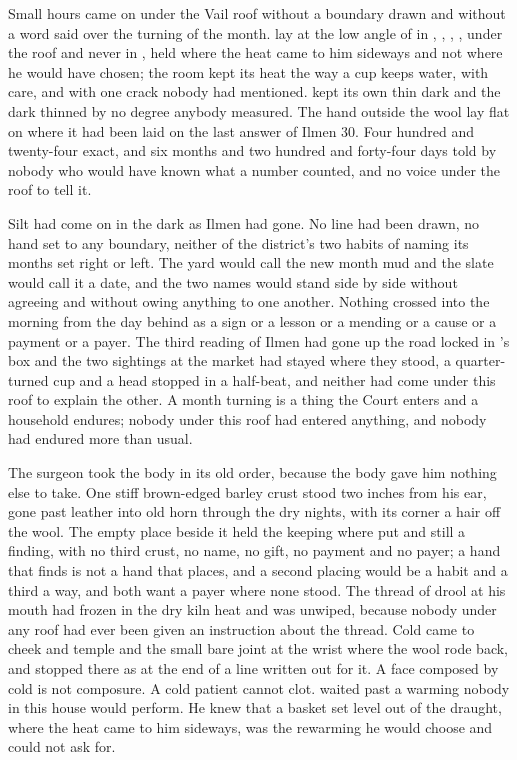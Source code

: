 
Small hours came on under the Vail roof without a boundary drawn and without a word said over the turning of the month.  lay at the low angle of  in , , , , under the roof and never in , held where the heat came to him sideways and not where he would have chosen; the room kept its heat the way a cup keeps water, with care, and with one crack nobody had mentioned.  kept its own thin dark and the dark thinned by no degree anybody measured. The hand outside the wool lay flat on  where it had been laid on the last answer of Ilmen 30. Four hundred and twenty-four exact, and six months and two hundred and forty-four days told by nobody who would have known what a number counted, and no voice under the roof to tell it.

Silt had come on in the dark as Ilmen had gone. No line had been drawn, no hand set to any boundary, neither of the district's two habits of naming its months set right or left. The yard would call the new month mud and the slate would call it a date, and the two names would stand side by side without agreeing and without owing anything to one another. Nothing crossed into the morning from the day behind as a sign or a lesson or a mending or a cause or a payment or a payer. The third reading of Ilmen had gone up the road locked in 's box and the two sightings at the market had stayed where they stood, a quarter-turned cup and a head stopped in a half-beat, and neither had come under this roof to explain the other. A month turning is a thing the Court enters and a household endures; nobody under this roof had entered anything, and nobody had endured more than usual.

The surgeon took the body in its old order, because the body gave him nothing else to take. One stiff brown-edged barley crust stood two inches from his ear, gone past leather into old horn through the dry nights, with its corner a hair off the wool. The empty place beside it held the keeping where put and still a finding, with no third crust, no name, no gift, no payment and no payer; a hand that finds is not a hand that places, and a second placing would be a habit and a third a way, and both want a payer where none stood. The thread of drool at his mouth had frozen in the dry kiln heat and was unwiped, because nobody under any roof had ever been given an instruction about the thread. Cold came to cheek and temple and the small bare joint at the wrist where the wool rode back, and stopped there as at the end of a line written out for it. A face composed by cold is not composure. A cold patient cannot clot.  waited past a warming nobody in this house would perform. He knew that a basket set level out of the draught, where the heat came to him sideways, was the rewarming he would choose and could not ask for.

